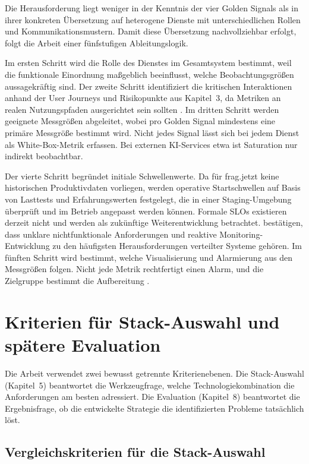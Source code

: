 Die Herausforderung liegt weniger in der Kenntnis der vier Golden Signals als in ihrer konkreten Übersetzung auf heterogene Dienste mit unterschiedlichen Rollen und Kommunikationsmustern. Damit diese Übersetzung nachvollziehbar erfolgt, folgt die Arbeit einer fünfstufigen Ableitungslogik.
 
Im ersten Schritt wird die Rolle des Dienstes im Gesamtsystem bestimmt, weil die funktionale Einordnung maßgeblich beeinflusst, welche Beobachtungsgrößen aussagekräftig sind. Der zweite Schritt identifiziert die kritischen Interaktionen anhand der User Journeys und Risikopunkte aus Kapitel~3, da Metriken an realen Nutzungspfaden ausgerichtet sein sollten \parencite[S.~10--11]{Niedermaier2019onObservability}. Im dritten Schritt werden geeignete Messgrößen abgeleitet, wobei pro Golden Signal mindestens eine primäre Messgröße bestimmt wird. Nicht jedes Signal lässt sich bei jedem Dienst als White-Box-Metrik erfassen. Bei externen KI-Services etwa ist Saturation nur indirekt beobachtbar.
 
Der vierte Schritt begründet initiale Schwellenwerte. Da für frag.jetzt keine historischen Produktivdaten vorliegen, werden operative Startschwellen auf Basis von Lasttests und Erfahrungswerten festgelegt, die in einer Staging-Umgebung überprüft und im Betrieb angepasst werden können. Formale SLOs existieren derzeit nicht und werden als zukünftige Weiterentwicklung betrachtet. \textcite[S.~9]{Niedermaier2019onObservability} bestätigen, dass unklare nichtfunktionale Anforderungen und reaktive Monitoring-Entwicklung zu den häufigsten Herausforderungen verteilter Systeme gehören. Im fünften Schritt wird bestimmt, welche Visualisierung und Alarmierung aus den Messgrößen folgen. Nicht jede Metrik rechtfertigt einen Alarm, und die Zielgruppe bestimmt die Aufbereitung \parencite[S.~175]{vinnakota2025creating}.
 
 
\section{Kriterien für Stack-Auswahl und spätere Evaluation}
 
Die Arbeit verwendet zwei bewusst getrennte Kriterienebenen. Die Stack-Auswahl (Kapitel~5) beantwortet die Werkzeugfrage, welche Technologiekombination die Anforderungen am besten adressiert. Die Evaluation (Kapitel~8) beantwortet die Ergebnisfrage, ob die entwickelte Strategie die identifizierten Probleme tatsächlich löst.
 
\subsection{Vergleichskriterien für die Stack-Auswahl}
 
